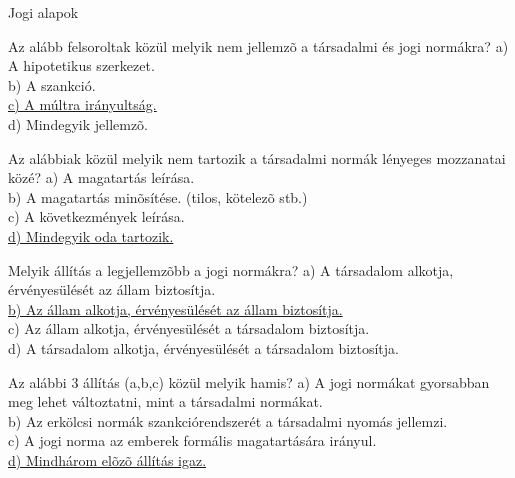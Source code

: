 \begin{frame}[plain]
\begin{tcolorbox}[center, colback={myyellow}, coltext={black}, colframe={myyellow}]
    { Jogi alapok}\\
\end{tcolorbox}
\end{frame}

\begin{frame}  

\begin{tcolorbox}[title={1. Kérdés}]
Az alább felsoroltak közül melyik nem jellemzõ a társadalmi és jogi normákra?
\tcblower
a) A hipotetikus szerkezet.\\
b) A szankció.\\
\uline {c) A múltra irányultság.}\\
d) Mindegyik jellemzõ.
\end{tcolorbox}

\begin{tcolorbox}[title={2. Kérdés}]
Az alábbiak közül melyik nem tartozik a társadalmi normák lényeges mozzanatai közé?
\tcblower
a) A magatartás leírása.\\
b) A magatartás minõsítése. (tilos, kötelezõ stb.)\\
c) A következmények leírása.\\
\uline {d) Mindegyik oda tartozik.}
\end{tcolorbox}

\begin{tcolorbox}[title={3. Kérdés}]
Melyik állítás a legjellemzõbb a jogi normákra?
\tcblower
a) A társadalom alkotja, érvényesülését az állam biztosítja.\\
\uline {b) Az állam alkotja, érvényesülését az állam biztosítja.}\\
c) Az állam alkotja, érvényesülését a társadalom biztosítja.\\
d) A társadalom alkotja, érvényesülését a társadalom biztosítja.
\end{tcolorbox}

\begin{tcolorbox}[title={4. Kérdés}]
Az alábbi 3 állítás (a,b,c) közül melyik hamis?
\tcblower
a) A jogi normákat gyorsabban meg lehet változtatni, mint a társadalmi normákat.\\
b) Az erkölcsi normák szankciórendszerét a társadalmi nyomás jellemzi.\\
c) A jogi norma az emberek formális magatartására irányul.\\
\uline {d) Mindhárom elõzõ állítás igaz.}
\end{tcolorbox}

\end{frame}


